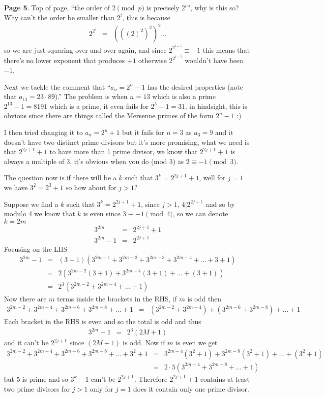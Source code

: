 \documentclass[aps,preprint,preprintnumbers,nofootinbib,showpacs,prd]{revtex4-1}
\newcommand{\nbea}{\begin{eqnarray*}}
\newcommand{\neea}{\end{eqnarray*}}
\begin{document}
{\bf Page 5}. Top of page, ``the order of $2 \pmod{p}$ is precisely $2^i$'', why is this so? Why can't the order be smaller than $2^i$, this is because
%
\nbea
2^{2^i} & = & \left(\left(\left(2\right)^2\right)^2\right)^2\dots
\neea
%
so we are just squaring over and over again, and since $2^{2^{i-1}} \equiv -1$ this means that there's no lower exponent that produces $+1$ otherwise $2^{2^{i-1}}$ wouldn't have been $-1$.

Next we tackle the comment that ``$a_n = 2^n - 1$ has the desired properties (note that $a_{11} = 23\cdot89$).'' The problem is when $n=13$ which is also a prime $2^{13}-1=8191$ which is a prime, it even fails for $2^5 - 1 = 31$, in hindsight, this is obvious since there are things called the Mersenne primes  of the form $2^n - 1$ :)

I then tried changing it to $a_n = 2^n + 1$ but it fails for $n=3$ as $a_3 = 9$ and it doesn't have two distinct prime divisors but it's more promising, what we need is that $2^{2j+1} + 1$ to have more than 1 prime divisor, we know that $2^{2j+1} + 1$ is always a multiple of 3, it's obvious when you do (mod 3) as $2 \equiv -1 \pmod{3}$.

The question now is if there will be a $k$ such that $3^k = 2^{2j+1} + 1$, well for $j=1$ we have $3^2 = 2^3 + 1$ so how about for $j > 1$?

Suppose we find a $k$ such that $3^k = 2^{2j+1} + 1$, since $j > 1$, $4|2^{2j+1}$ and so by modulo 4 we know that $k$ is even since $3 \equiv -1 \pmod{4}$, so we can denote $k = 2m$
%
\nbea
3^{2m} & = & 2^{2j+1} + 1 \\
3^{2m} - 1 & = & 2^{2j+1}
\neea
%
Focusing on the LHS
%
\nbea
3^{2m} - 1 & = & (3 - 1)(3^{2m-1} + 3^{2m-2} + 3^{2m-3} + 3^{2m-4} + \dots + 3 + 1) \\
& = & 2(3^{2m-2} (3 + 1) + 3^{2m-4}(3 + 1) + \dots + (3 + 1)) \\
& = & 2^3(3^{2m-2} + 3^{2m-4} + \dots + 1)
\neea
%
Now there are $m$ terms inside the brackets in the RHS, if $m$ is odd then
%
\nbea
3^{2m-2} + 3^{2m-4} + 3^{2m-6} + 3^{2m-8} + \dots + 1 & = & (3^{2m-2} + 3^{2m-4}) + (3^{2m-6} + 3^{2m-8}) + \dots + 1 
\neea
%
Each bracket in the RHS is even and so the total is odd and thus
%
\nbea
3^{2m} - 1 & = & 2^3(2M+1)
\neea
%
and it can't be $2^{2j+1}$ since $(2M+1)$ is odd. Now if $m$ is even we get
%
\nbea
3^{2m-2} + 3^{2m-4} + 3^{2m-6} + 3^{2m-8} + \dots + 3^2 + 1 & = & 3^{2m-4}(3^2 + 1) + 3^{2m-8}(3^2 + 1) + \dots + (3^2 + 1) \\
& = & 2\cdot5(3^{2m-4} + 3^{2m-8} + \dots + 1)
\neea
%
but $5$ is prime and so $3^k - 1$ can't be $2^{2j+1}$. Therefore $2^{2j+1} + 1$ contains at least two prime divisors for $j > 1$ only for $j=1$ does it contain only one prime divisor.
\end{document}
